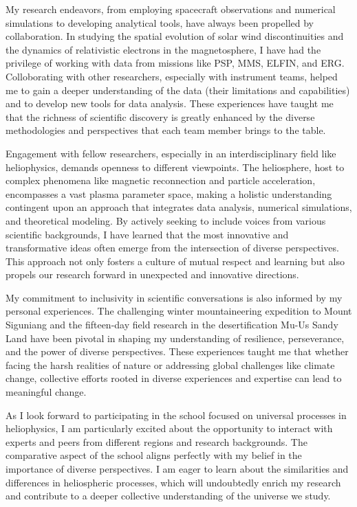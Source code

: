 \documentclass[
  letterpaper,
  DIV=11,
  numbers=noendperiod]{scrartcl}
\begin{document}
My research endeavors, from employing spacecraft observations and
numerical simulations to developing analytical tools, have always been
propelled by collaboration. In studying the spatial evolution of solar
wind discontinuities and the dynamics of relativistic electrons in the
magnetosphere, I have had the privilege of working with data from
missions like PSP, MMS, ELFIN, and ERG. Colloborating with other
researchers, especially with instrument teams, helped me to gain a
deeper understanding of the data (their limitations and capabilities)
and to develop new tools for data analysis. These experiences have
taught me that the richness of scientific discovery is greatly enhanced
by the diverse methodologies and perspectives that each team member
brings to the table.

Engagement with fellow researchers, especially in an interdisciplinary
field like heliophysics, demands openness to different viewpoints. The
heliosphere, host to complex phenomena like magnetic reconnection and
particle acceleration, encompasses a vast plasma parameter space, making
a holistic understanding contingent upon an approach that integrates
data analysis, numerical simulations, and theoretical modeling. By
actively seeking to include voices from various scientific backgrounds,
I have learned that the most innovative and transformative ideas often
emerge from the intersection of diverse perspectives. This approach not
only fosters a culture of mutual respect and learning but also propels
our research forward in unexpected and innovative directions.

My commitment to inclusivity in scientific conversations is also
informed by my personal experiences. The challenging winter
mountaineering expedition to Mount Siguniang and the fifteen-day field
research in the desertification Mu-Us Sandy Land have been pivotal in
shaping my understanding of resilience, perseverance, and the power of
diverse perspectives. These experiences taught me that whether facing
the harsh realities of nature or addressing global challenges like
climate change, collective efforts rooted in diverse experiences and
expertise can lead to meaningful change.

As I look forward to participating in the school focused on universal
processes in heliophysics, I am particularly excited about the
opportunity to interact with experts and peers from different regions
and research backgrounds. The comparative aspect of the school aligns
perfectly with my belief in the importance of diverse perspectives. I am
eager to learn about the similarities and differences in heliospheric
processes, which will undoubtedly enrich my research and contribute to a
deeper collective understanding of the universe we study.
\end{document}
